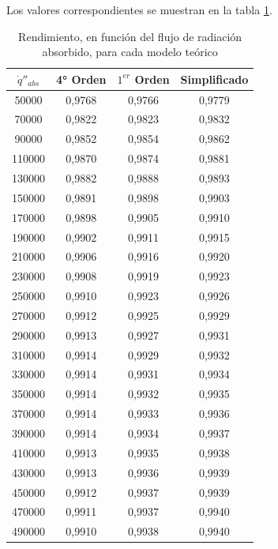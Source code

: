 Los valores correspondientes se muestran en la tabla \ref{tab:rendimiento_qabs}.

\begin{table}[H]
\centering
\caption{Rendimiento, en función del flujo de radiación absorbido, para cada modelo teórico}
\label{tab:rendimiento_qabs}
\begin{tabular}{cccc}
$\dot q''_{abs}$    & 4° Orden & $1^{er}$ Orden & Simplificado \\ \hline
50000  & 0,9768   & 0,9766    & 0,9779       \\
70000  & 0,9822   & 0,9823    & 0,9832       \\
90000  & 0,9852   & 0,9854    & 0,9862       \\
110000 & 0,9870   & 0,9874    & 0,9881       \\
130000 & 0,9882   & 0,9888    & 0,9893       \\
150000 & 0,9891   & 0,9898    & 0,9903       \\
170000 & 0,9898   & 0,9905    & 0,9910       \\
190000 & 0,9902   & 0,9911    & 0,9915       \\
210000 & 0,9906   & 0,9916    & 0,9920       \\
230000 & 0,9908   & 0,9919    & 0,9923       \\
250000 & 0,9910   & 0,9923    & 0,9926       \\
270000 & 0,9912   & 0,9925    & 0,9929       \\
290000 & 0,9913   & 0,9927    & 0,9931       \\
310000 & 0,9914   & 0,9929    & 0,9932       \\
330000 & 0,9914   & 0,9931    & 0,9934       \\
350000 & 0,9914   & 0,9932    & 0,9935       \\
370000 & 0,9914   & 0,9933    & 0,9936       \\
390000 & 0,9914   & 0,9934    & 0,9937       \\
410000 & 0,9913   & 0,9935    & 0,9938       \\
430000 & 0,9913   & 0,9936    & 0,9939       \\
450000 & 0,9912   & 0,9937    & 0,9939       \\
470000 & 0,9911   & 0,9937    & 0,9940       \\
490000 & 0,9910   & 0,9938    & 0,9940
\end{tabular}
\end{table}


